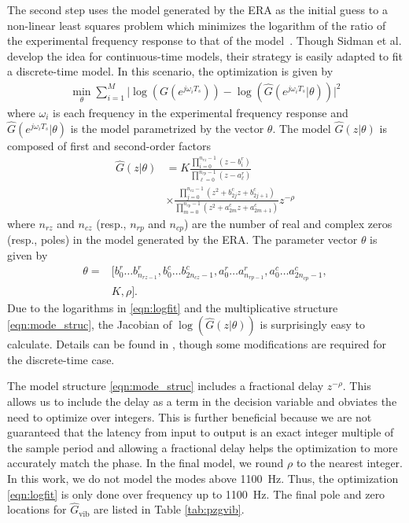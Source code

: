 \documentclass[twocolumn,twoside]{IEEEtran}
\newcommand{\hGv}{\ensuremath{\hat{G}_{\text{vib}}}\xspace}
\begin{document}
The second step uses the model generated by the ERA as the initial guess to a non-linear least squares problem which minimizes the logarithm of the ratio of the experimental frequency response to that of the model~\cite{sidman_parametric_1991}. Though Sidman et al. develop the idea for continuous-time models, their strategy is easily adapted to fit a discrete-time model. In this scenario, the optimization is given by
\begin{align}
\min_{\theta} \sum_{i=1}^M\bigl| \log(G(e^{j\omega_iT_s})) - \log(\hat{G}(e^{j\omega_iT_s}|\theta))\bigr|^2
\label{eqn:logfit}
\end{align}
where $\omega_i$ is each frequency in the experimental frequency response and $\hat{G}(e^{j\omega_iT_s}|\theta)$ is the model parametrized by the vector $\theta$. The model $\hat{G}(z|\theta)$ is composed of first and second-order factors
\begin{align}
  \hat{G}(z|\theta) &=K \frac{\prod_{i=0}^{n_{rz}-1} (z-b^r_i)}{\prod_{\ell=0}^{n_{rp}-1}(z-a^r_\ell) } \nonumber\\ 
  &\times\frac{\prod_{j=0}^{n_{cz}-1}(z^2 +b^c_{2j}z + b^c_{2j+1})}{ \prod_{m=0}^{n_{cp}-1}(z^2 +a^c_{2m}z + a^c_{2m+1})}z^{-\rho} \label{eqn:mode_struc}
\end{align}
where $n_{rz}$ and $n_{cz}$ (resp., $n_{rp}$ and $n_{cp}$) are the number of real and complex zeros (resp., poles) in the model generated by the ERA. The parameter vector $\theta$ is given by 
\begin{align*}
  \theta =&[b^r_0\dots b^r_{n_{rz-1}}, b^c_{0}\dots b^c_{2n_{cz}-1}, a^r_0\dots a^r_{n_{rp-1}},a^c_{0}\dots a^c_{2n_{cp}-1},\\
  & K, \rho].\nonumber
\end{align*}
Due to the logarithms in \eqref{eqn:logfit} and the multiplicative structure \eqref{eqn:mode_struc}, the Jacobian of $\log(\hat{G}(z|\theta))$ is surprisingly easy to calculate. Details can be found in \cite{sidman_parametric_1991}, though some modifications are required for the discrete-time case. 

The model structure \eqref{eqn:mode_struc} includes a fractional delay $z^{-\rho}$. This allows us to include the delay as a term in the decision variable and obviates the need to optimize over integers. This is further beneficial because we are not guaranteed that the latency from input to output is an exact integer multiple of the sample period and allowing a fractional delay helps the optimization to more accurately match the phase. In the final model, we round $\rho$ to the nearest integer. In this work, we do not model the modes above 1100~Hz. Thus, the optimization \eqref{eqn:logfit} is only done over frequency up to 1100~Hz. The final pole and zero locations for $\hGv$ are listed in Table \ref{tab:pzgvib}.
\end{document}
